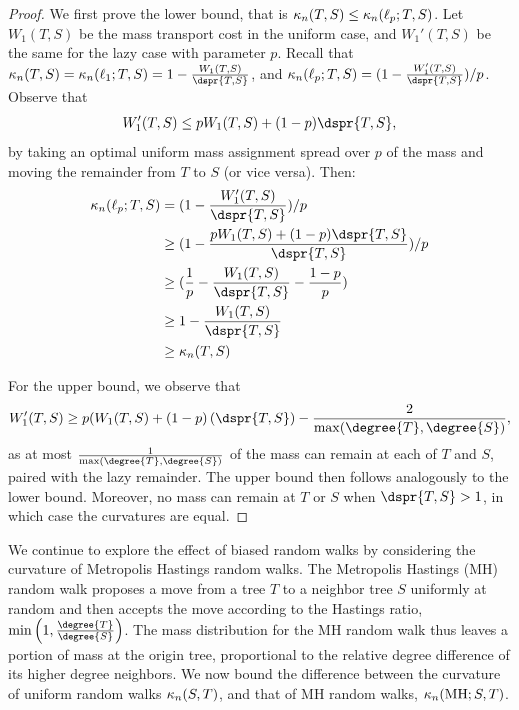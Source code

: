\documentclass[11pt,onecolumn,conference]{IEEEtran}
\newcommand{\MH}{\operatorname{MH}}
\newcommand{\curvature}[2][]{%
    \ifthenelse{\equal{#1}{}}%
		{\kappa_n(#2)}%
		{\kappa_n(#1;#2)}%
}
\begin{document}
\begin{proof}
	We first prove the lower bound, that is $\curvature{T,S} \le \curvature[\ell_p]{T,S}$.
	Let $W_1(T,S)$ be the mass transport cost in the uniform case, and $W_1'(T,S)$ be the same for the lazy case with parameter $p$.
	Recall that $\curvature{T,S} = \curvature[\ell_1]{T,S} = 1 - \frac{W_1(T,S)}{\dspr{T,S}}$, and $\curvature[\ell_p]{T,S} = (1 - \frac{W_1'(T,S)}{\dspr{T,S}}) / p$.
	Observe that $$W_1'(T,S) \le pW_1(T,S) + (1-p)\dspr{T,S},$$ by taking an optimal uniform mass assignment spread over $p$ of the mass and moving the remainder from $T$ to $S$ (or vice versa).
	Then:
	\begin{align*}
		\curvature[\ell_p]{T,S} &= (1 - \frac{W_1'(T,S)}{\dspr{T,S}}) / p \\
		&\ge (1 - \frac{pW_1(T,S) + (1-p)\dspr{T,S}}{\dspr{T,S}}) / p \\
		&\ge (\frac{1}{p} - \frac{W_1(T,S)}{\dspr{T,S}} - \frac{1-p}{p}) \\
		&\ge 1 - \frac{W_1(T,S)}{\dspr{T,S}} \\
		&\ge \curvature{T,S}
	\end{align*}

	For the upper bound, we observe that $$W_1'(T,S) \ge p(W_1(T,S) + (1-p)\left(\dspr{T,S}\right) - \frac{2}{\max(\degree{T}, \degree{S})},$$ as at most $\frac{1}{\max(\degree{T},\degree{S})}$ of the mass can remain at each of $T$ and $S$, paired with the lazy remainder.
	The upper bound then follows analogously to the lower bound.
	Moreover, no mass can remain at $T$ or $S$ when $\dspr{T,S} > 1$, in which case the curvatures are equal.
\end{proof}

We continue to explore the effect of biased random walks by considering the curvature of Metropolis Hastings random walks.
The Metropolis Hastings (MH) random walk proposes a move from a tree $T$ to a neighbor tree $S$ uniformly at random and then accepts the move according to the Hastings ratio, $\min\left(1, \frac{\degree{T}}{\degree{S}}\right)$.
The mass distribution for the MH random walk thus leaves a portion of mass at the origin tree, proportional to the relative degree difference of its higher degree neighbors.
We now bound the difference between the curvature of uniform random walks $\curvature{S,T}$, and that of MH random walks, $\curvature[\MH]{S,T}$.
\end{document}
